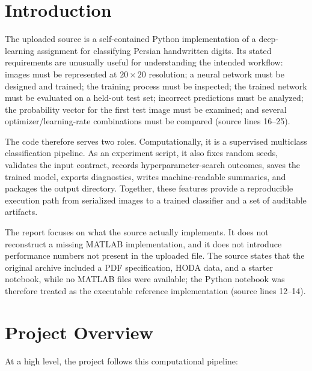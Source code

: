 \documentclass[11pt,a4paper]{article}
\begin{document}
\section{Introduction}
The uploaded source is a self-contained Python implementation of a deep-learning assignment for classifying Persian handwritten digits. Its stated requirements are unusually useful for understanding the intended workflow: images must be represented at $20\times20$ resolution; a neural network must be designed and trained; the training process must be inspected; the trained network must be evaluated on a held-out test set; incorrect predictions must be analyzed; the probability vector for the first test image must be examined; and several optimizer/learning-rate combinations must be compared (source lines 16--25).

The code therefore serves two roles. Computationally, it is a supervised multiclass classification pipeline. As an experiment script, it also fixes random seeds, validates the input contract, records hyperparameter-search outcomes, saves the trained model, exports diagnostics, writes machine-readable summaries, and packages the output directory. Together, these features provide a reproducible execution path from serialized images to a trained classifier and a set of auditable artifacts.

The report focuses on what the source actually implements. It does not reconstruct a missing MATLAB implementation, and it does not introduce performance numbers not present in the uploaded file. The source states that the original archive included a PDF specification, HODA data, and a starter notebook, while no MATLAB files were available; the Python notebook was therefore treated as the executable reference implementation (source lines 12--14).

\section{Project Overview}
At a high level, the project follows this computational pipeline:
\end{document}
